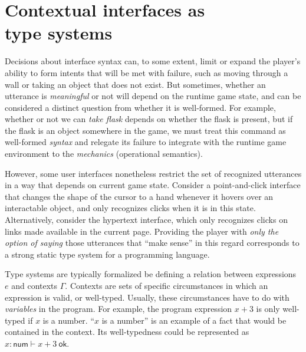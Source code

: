 % 

  

  \section{Contextual interfaces as \\ type systems}
  \label{sec:typesys}

  Decisions about interface syntax can, to some extent, limit or expand the
  player's ability to form intents that will be met with failure, such as
  moving through a wall or taking an object that does not exist. But
  sometimes, whether an utterance is {\em meaningful} or not will depend on
  the runtime game state, and can be considered a distinct question from whether it is
  well-formed. For example, whether or not we can {\em take
  flask} depends on whether the flask is present, but if the flask is an
  object somewhere in the game, we must treat this command as well-formed {\em
  syntax} and relegate its failure to integrate with the runtime game
  environment to the {\em mechanics} (operational semantics).

  However, some user interfaces nonetheless restrict the set of recognized
  utterances in a way that depends on current game state. Consider a
  point-and-click interface that changes the shape of the cursor to a hand
  whenever it hovers over an interactable object, and only recognizes
  clicks when it is in this state. Alternatively, consider the hypertext
  interface, which only recognizes clicks on links made available in the
  current page.  Providing the player with {\em only the option of saying}
  those utterances that ``make sense'' in this regard corresponds to a
  strong static type system for a programming language.

  Type systems are typically formalized be defining a relation between
  expressions $e$ and contexts $\Gamma$. Contexts are sets of specific
  circumstances in which an expression is valid, or well-typed. Usually,
  these circumstances have to do with {\em variables} in the program. For
  example, the program expression $x+3$ is only well-typed if $x$ is
  a number. ``$x$ is a number'' is an example of a fact that would be
  contained in the context. Its well-typedness could be represented as
  $x{:}\mathsf{num} \vdash x+3{\ \mathsf{ok}}$.
  

